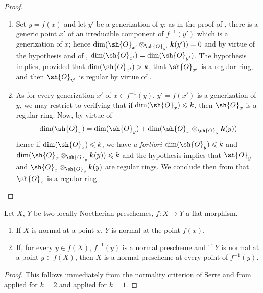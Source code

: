 \begin{proof}
\medskip\noindent
\begin{enumerate}[label=(\roman*)]
  \item Set $y=f(x)$ and let $y'$ be a generization of $y$; as in the proof of , there is a generic point $x'$ of an irreducible component of $f^{-1}(y')$ which is a generization of $x$; hence $\dim(\sh{O}_{x'}\otimes_{\sh{O}_{y'}}\boldsymbol{k}(y'))=0$ and by virtue of the hypothesis and of , $\dim(\sh{O}_{x'})=\dim(\sh{O}_{y'})$.
The hypothesis implies, provided that $\dim(\sh{O}_{x'})>k$, that $\sh{O}_{x'}$ is a regular ring, and then $\sh{O}_{y'}$ is regular by virtue of .

  \item As for every generization $x'$ of $x\in f^{-1}(y)$, $y'=f(x')$ is a generization of $y$, we may restrict to verifying that if $\dim(\sh{O}_x)\leqslant k$, then $\sh{O}_x$ is a regular ring.
Now, by virtue of 
\[
  \dim(\sh{O}_x)=\dim(\sh{O}_y)+\dim(\sh{O}_x\otimes_{\sh{O}_y}\boldsymbol{k}(y))
\]
hence if $\dim(\sh{O}_x)\leqslant k$, we have \emph{a fortiori} $\dim(\sh{O}_y)\leqslant k$ and $\dim(\sh{O}_x\otimes_{\sh{O}_y}\boldsymbol{k}(y))\leqslant k$ and the hypothesis implies that $\sh{O}_y$ and $\sh{O}_x\otimes_{\sh{O}_y}\boldsymbol{k}(y)$ are regular rings.
We conclude then from  that $\sh{O}_x$ is a regular ring.
\end{enumerate}
\end{proof}

\begin{corollary}[6.5.4]
\label{IV.6.5.4}
Let $X$, $Y$ be two locally Noetherian preschemes, $f:X\to Y$ a flat morphism.
\begin{enumerate}[label=(\roman*)]
  \item If $X$ is normal at a point $x$, $Y$ is normal at the point $f(x)$.
  \item If, for every $y\in f(X)$, $f^{-1}(y)$ is a normal prescheme and if $Y$ is normal at a point $y\in f(X)$, then $X$ is a normal prescheme at every point of $f^{-1}(y)$.
\end{enumerate}
\end{corollary}

\begin{proof}
This follows immediately from the normality criterion of Serre  and from  applied for $k=2$ and  applied for $k=1$.
\end{proof}

